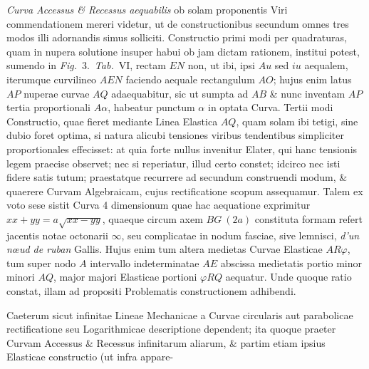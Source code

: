 \documentclass{article}
\begin{document}
\emph{Curva Accessus \& Recessus aequabilis} ob solam proponentis Viri commendationem mereri videtur,
ut de constructionibus secundum omnes tres modos illi adornandis simus solliciti. Constructio primi
modi per quadraturas, quam in nupera solutione insuper habui ob jam dictam rationem, institui potest,
sumendo in \emph{Fig.}~3.\ \emph{Tab.}~VI, rectam $EN$ non, ut ibi, ipsi $Au$ sed $iu$ aequalem,
iterumque curvilineo $AEN$ faciendo aequale rectangulum $AO$; hujus enim latus $AP$ nuperae curvae
$AQ$ adaequabitur, sic ut sumpta ad $AB$ \& nunc inventam $AP$ tertia proportionali $A\alpha$,
habeatur punctum $\alpha$ in optata Curva. Tertii modi Constructio, quae fieret mediante Linea
Elastica $AQ$, quam solam ibi tetigi, sine dubio foret optima, si natura alicubi tensiones viribus
tendentibus simpliciter proportionales effecisset: at quia forte nullus invenitur Elater, qui hanc
tensionis legem praecise observet; nec si reperiatur, illud certo constet; idcirco nec isti fidere
satis tutum; praestatque recurrere ad secundum construendi modum, \& quaerere Curvam Algebraicam,
cujus rectificatione scopum assequamur. Talem ex voto sese sistit Curva 4 dimensionum quae hac
aequatione exprimitur $xx + yy = a\sqrt{xx - yy}$, quaeque circum axem $BG\ (2a)$ constituta formam
refert jacentis notae octonarii $\infty$, seu complicatae in nodum fasciae, sive lemnisci,
\emph{d'un nœud de ruban} Gallis. Hujus enim tum altera medietas Curvae Elasticae $AR\varphi$, tum
super nodo $A$ intervallo indeterminatae $AE$ abscissa medietatis portio minor minori $AQ$, major
majori Elasticae portioni $\varphi RQ$ aequatur. Unde quoque ratio constat, illam ad propositi
Problematis constructionem adhibendi.


Caeterum sicut infinitae Lineae Mechanicae a Curvae circularis aut parabolicae rectificatione seu
Logarithmicae descriptione dependent; ita quoque praeter Curvam Accessus \& Recessus infinitarum
aliarum, \& partim etiam ipsius Elasticae constructio (ut infra appare-
\end{document}
